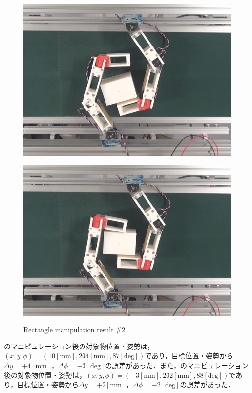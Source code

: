 \documentclass[a4paper,twoside,12pt,papersize, dvipdfmx]{iirthesis}
\begin{document}
\begin{figure}[b]
\begin{minipage}{0.249\hsize}
\includegraphics[width=0.98\hsize]{fig/4-manipulation-result/Rectangle/2-3.jpg}
\subcaption{}\label{}
\end{minipage}\hfill
\begin{minipage}{0.249\hsize}
\centering
\includegraphics[width=0.98\hsize]{fig/4-manipulation-result/Rectangle/2-4.jpg}
\subcaption{}\label{}
\end{minipage}
\caption{Rectangle manipulation result \#2}\label{fig::result::rm2}
\end{figure}

のマニピュレーション後の対象物位置・姿勢は，$(x, y, \phi) = (10 \mathrm{[mm]}, 204 \mathrm{[mm]}, 87 \mathrm{[deg]})$であり，目標位置・姿勢から$\Delta y = +4 \mathrm{[mm]}$，$\Delta \phi = -3 \mathrm{[deg]}$の誤差があった．また，のマニピュレーション後の対象物位置・姿勢は，$(x, y, \phi) = (-3 \mathrm{[mm]}, 202 \mathrm{[mm]}, 88 \mathrm{[deg]})$であり，目標位置・姿勢から$\Delta y = +2 \mathrm{[mm]}$，$\Delta \phi = -2 \mathrm{[deg]}$の誤差があった．\par
\end{document}
